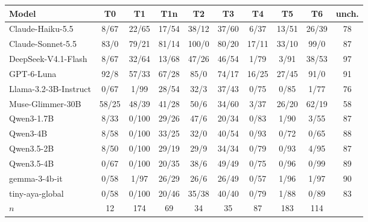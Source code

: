 \begin{tabular}{@{}l cccccccc c@{}}
\toprule
Model & T0 & T1 & T1n & T2 & T3 & T4 & T5 & T6 & unch. \\
\midrule
Claude-Haiku-5.5 & 8/67 & 22/65 & 17/54 & 38/12 & 37/60 & 6/37 & 13/51 & 26/39 & 78 \\
Claude-Sonnet-5.5 & 83/0 & 79/21 & 81/14 & 100/0 & 80/20 & 17/11 & 33/10 & 99/0 & 87 \\
DeepSeek-V4.1-Flash & 8/67 & 32/64 & 13/68 & 47/26 & 46/54 & 1/79 & 3/91 & 38/53 & 97 \\
GPT-6-Luna & 92/8 & 57/33 & 67/28 & 85/0 & 74/17 & 16/25 & 27/45 & 91/0 & 91 \\
Llama-3.2-3B-Instruct & 0/67 & 1/99 & 28/54 & 32/3 & 37/43 & 0/75 & 0/85 & 1/77 & 76 \\
Muse-Glimmer-30B & 58/25 & 48/39 & 41/28 & 50/6 & 34/60 & 3/37 & 26/20 & 62/19 & 58 \\
Qwen3-1.7B & 8/33 & 0/100 & 29/26 & 47/6 & 20/34 & 0/83 & 1/90 & 3/55 & 87 \\
Qwen3-4B & 8/58 & 0/100 & 33/25 & 32/0 & 40/54 & 0/93 & 0/72 & 0/65 & 88 \\
Qwen3.5-2B & 8/50 & 0/100 & 29/19 & 29/9 & 34/34 & 0/79 & 0/93 & 4/95 & 87 \\
Qwen3.5-4B & 0/67 & 0/100 & 20/35 & 38/6 & 49/49 & 0/75 & 0/96 & 0/99 & 89 \\
gemma-3-4b-it & 0/58 & 1/97 & 26/29 & 26/6 & 26/49 & 0/57 & 1/96 & 1/97 & 90 \\
tiny-aya-global & 0/58 & 0/100 & 20/46 & 35/38 & 40/40 & 0/79 & 1/88 & 0/89 & 83 \\
\midrule
$n$ & 12 & 174 & 69 & 34 & 35 & 87 & 183 & 114 & \\
\bottomrule
\end{tabular}
